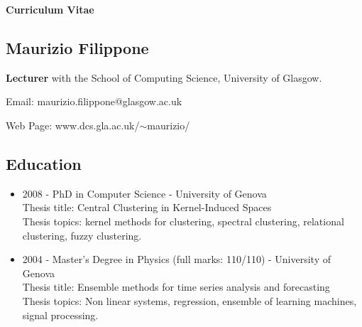 \documentclass[a4paper,10pt]{article}
\begin{document}
\begin{center}
{\bf \LARGE Curriculum Vitae}
\end{center}

\vspace{1cm}

\subsection*{Maurizio Filippone}
\begin{description}
\item 
  {\bf Lecturer} with the School of Computing Science, University of Glasgow.
\item Email:              maurizio.filippone@glasgow.ac.uk
\item Web Page:           www.dcs.gla.ac.uk/$\sim$maurizio/
\end{description}

\subsection*{Education}
\begin{itemize}
\item 2008 - PhD in Computer Science - University of Genova \\
Thesis title: Central Clustering in Kernel-Induced Spaces \\
Thesis topics: kernel methods for clustering, spectral clustering, relational clustering, fuzzy clustering.

\item 2004 - Master's Degree in Physics (full marks: 110/110) - University of Genova \\
Thesis title: Ensemble methods for time series analysis and forecasting \\
Thesis topics: Non linear systems, regression, ensemble of learning machines, signal processing.
\end{itemize}
\end{document}
